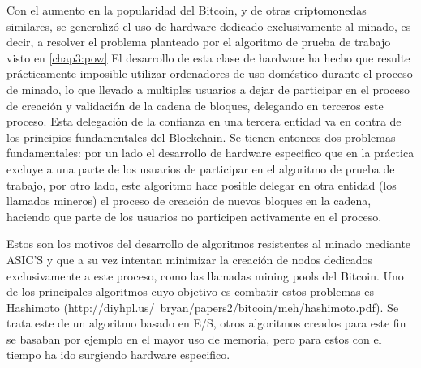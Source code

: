 Con el aumento en la popularidad del Bitcoin, y de otras criptomonedas similares, se generalizó el uso de hardware dedicado exclusivamente al minado, es decir, a resolver el problema planteado por el algoritmo de prueba de trabajo visto en \ref{chap3:pow} El desarrollo de esta clase de hardware ha hecho que resulte prácticamente imposible utilizar ordenadores de uso doméstico durante el proceso de minado, lo que llevado a multiples usuarios a dejar de participar en el proceso de creación y validación de la cadena de bloques, delegando en terceros este proceso. Esta delegación de la confianza en una tercera entidad va en contra de los principios fundamentales del Blockchain. Se tienen entonces dos problemas fundamentales: por un lado el desarrollo de hardware especifico que en la práctica excluye a una parte de los usuarios de participar en el algoritmo de prueba de trabajo, por otro lado, este algoritmo hace posible delegar en otra entidad (los llamados mineros) el proceso de creación de nuevos bloques en la cadena, haciendo que parte de los usuarios no participen activamente en el proceso.
\begin{figure}[H]
  \qquad
	\label{fig:test}%
\end{figure}
Estos son los motivos del desarrollo de algoritmos resistentes al minado mediante ASIC’S y que a su vez intentan minimizar la creación de nodos dedicados exclusivamente a este proceso, como las llamadas mining pools del Bitcoin. Uno de los principales algoritmos cuyo objetivo es combatir estos problemas es Hashimoto (http://diyhpl.us/~bryan/papers2/bitcoin/meh/hashimoto.pdf). Se trata este de un algoritmo basado en E/S, otros algoritmos creados para este fin se basaban por ejemplo en el mayor uso de memoria, pero para estos con el tiempo ha ido surgiendo hardware especifico.

